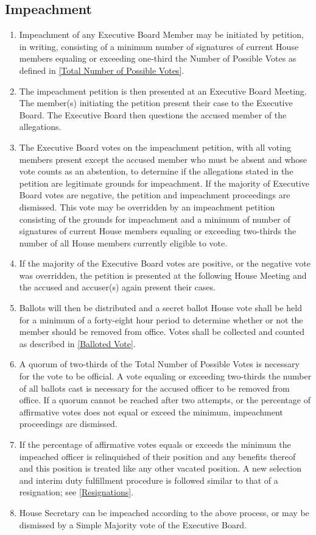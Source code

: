 \documentclass{article}
\newcommand{\asection}[1]{\subsection{#1} \label{#1}}
\begin{document}
\asection{Impeachment}
\begin{enumerate}
	\item Impeachment of any Executive Board Member may be initiated by petition, in writing, consisting of a minimum number of signatures of current House members equaling or exceeding one-third the Number of Possible Votes as defined in \ref{Total Number of Possible Votes}.
	\item The impeachment petition is then presented at an Executive Board Meeting. The member(s) initiating the petition present their case to the Executive Board. The Executive Board then questions the accused member of the allegations.
	\item The Executive Board votes on the impeachment petition, with all voting members present except the accused member who must be absent and whose vote counts as an abstention, to determine if the allegations stated in the petition are legitimate grounds for impeachment. If the majority of Executive Board votes are negative, the petition and impeachment proceedings are dismissed. This vote may be overridden by an impeachment petition consisting of the grounds for impeachment and a minimum of number of signatures of current House members equaling or exceeding two-thirds the number of all House members currently eligible to vote.
	\item If the majority of the Executive Board votes are positive, or the negative vote was overridden, the petition is presented at the following House Meeting and the accused and accuser(s) again present their cases.
	\item Ballots will then be distributed and a secret ballot House vote shall be held for a minimum of a forty-eight hour period to determine whether or not the member should be removed from office. Votes shall be collected and counted as described in \ref{Balloted Vote}.
	\item A quorum of two-thirds of the Total Number of Possible Votes is necessary for the vote to be official. A vote equaling or exceeding two-thirds the number of all ballots cast is necessary for the accused officer to be removed from office. If a quorum cannot be reached after two attempts, or the percentage of affirmative votes does not equal or exceed the minimum, impeachment proceedings are dismissed.
	\item If the percentage of affirmative votes equals or exceeds the minimum the impeached officer is relinquished of their position and any benefits thereof and this position is treated like any other vacated position. A new selection and interim duty fulfillment procedure is followed similar to that of a resignation; see \ref{Resignations}.
	\item House Secretary can be impeached according to the above process, or may be dismissed by a Simple Majority vote of the Executive Board.
\end{enumerate}
\end{document}
